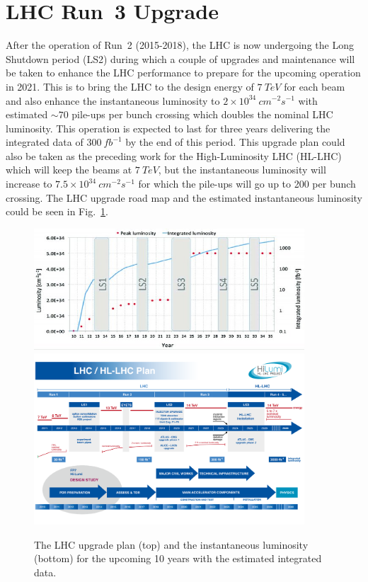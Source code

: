 \section{LHC Run~3 Upgrade}
After the operation of Run~2 (2015-2018), the LHC is now undergoing the Long Shutdown period (LS2) during which a couple of upgrades and maintenance will be taken to enhance the LHC performance to prepare for the upcoming operation in 2021. This is to bring the LHC to the design energy of $7~TeV$ for each beam and also enhance the instantaneous luminosity to $2\times10^{34}~cm^{-2}s^{-1}$ with estimated $\sim 70$ pile-ups per bunch crossing which doubles the nominal LHC luminosity. This operation is expected to last for three years delivering the integrated data of $300~fb^{-1}$ by the end of this period. This upgrade plan could also be taken as the preceding work for the High-Luminosity LHC (HL-LHC) which will keep the beams at $7~TeV$, but the instantaneous luminosity will increase to $7.5\times10^{34}~cm^{-2}s^{-1}$ for which the pile-ups will go up to 200 per bunch crossing. The LHC upgrade road map and the estimated instantaneous luminosity could be seen in Fig.~\ref{Fig:LHC_upgrade}.
\begin{figure}[!h]                
	\includegraphics[width=0.9\textwidth]{Chapter6/The-LHC-upgrade-schedule-and-associated-luminosity.jpg}
	\includegraphics[width=0.9\textwidth]{Chapter6/Schedule_HL.png}
	\begin{center}
		\caption{The LHC upgrade plan (top)\cite{schedule} and the instantaneous luminosity (bottom)\cite{Atlas:2019qfx} for the upcoming 10 years with the estimated integrated data.}
		\label{Fig:LHC_upgrade}            
	\end{center}
\end{figure} 

